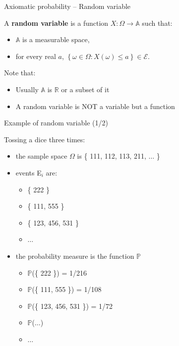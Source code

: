 \documentclass{beamer}
\begin{document}

\begin{frame}
{\centerline{Axiomatic probability -- Random variable}}

A \textbf{random variable} is a function $X : \Omega \to \mathbb{A}$ such that:
\begin{itemize}
\item $\mathbb{A}$ is a measurable space,
\item  for every real $a$, $\left\lbrace \omega \in \Omega: X(\omega) \leq a \right\rbrace \in \mathcal{E}$.
\end{itemize}

\vspace{0.5cm}
 Note that:
\begin{itemize}
\item Usually $\mathbb{A}$ is $\mathbb{R}$ or a subset of it
\item A random variable is NOT a variable but a function
\end{itemize}

\end{frame}
\begin{frame}
{\centerline{Example of random variable (1/2)}}

Tossing a dice three times:
\begin{itemize}
\item the sample space $\Omega$ is \{ 111, 112, 113, 211, $\ldots{}$ \}
\item events E$_i$ are:
\begin{itemize}
\item \{ 222 \}
\item \{ 111, 555 \}
\item \{ 123, 456, 531 \}
\item $\ldots{}$
\end{itemize}
\item the probability measure is the function $\mathbb{P}$
\begin{itemize}
\item $\mathbb{P}$(\{ 222 \}) = 1/216
\item $\mathbb{P}$(\{ 111, 555 \}) = 1/108
\item $\mathbb{P}$(\{ 123, 456, 531 \}) = 1/72
\item $\mathbb{P}$($\ldots{}$)
\item $\ldots{}$
\end{itemize}

\end{itemize}

\end{frame}
\end{document}
